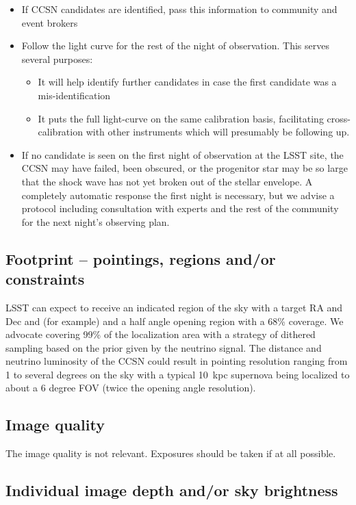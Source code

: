 \documentclass[12pt, letterpaper]{article}
\begin{document}
\begin{itemize}
\item If CCSN candidates are identified, pass this information to
  community and event brokers
\item Follow the light curve for the rest of the night of
  observation. This serves several purposes:
  \begin{itemize}
  \item It will help identify further candidates in case the first
    candidate was a mis-identification
  \item It puts the full light-curve on the same calibration basis,
    facilitating cross-calibration with other instruments which will
    presumably be following up.
  \end{itemize}
\item If no candidate is seen on the first night of observation at the
  LSST site, the CCSN may have failed, been obscured, or the
  progenitor star may be so large that the shock wave has not yet
  broken out of the stellar envelope.  A completely automatic response
  the first night is necessary, but we advise a protocol including
  consultation with experts and the rest of the community for the next
  night's observing plan.
\end{itemize}

\subsection{Footprint -- pointings, regions and/or constraints}

LSST can expect to receive an indicated region of the sky with a target
RA and Dec and (for example) and a half angle opening region with a
68\% coverage.  We advocate covering 99\% of the localization area
with a strategy of dithered sampling based on the prior given by the
neutrino signal.  The distance and neutrino luminosity of the CCSN
could result in pointing resolution ranging from 1 to several degrees
on the sky with a typical 10~kpc supernova being localized to about a
6 degree FOV (twice the opening angle resolution).

\subsection{Image quality}

The image quality is not relevant.  Exposures should be taken if at all possible.

\subsection{Individual image depth and/or sky brightness}
\end{document}
